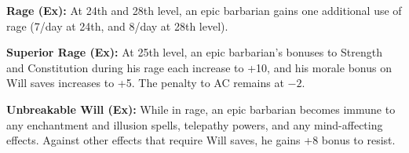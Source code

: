 \textbf{Rage (Ex):} At 24th and 28th level, an epic barbarian gains one additional use of rage (7/day at 24th, and 8/day at 28th level).

\textbf{Superior Rage (Ex):} At 25th level, an epic barbarian's bonuses to Strength and Constitution during his rage each increase to +10, and his morale bonus on Will saves increases to +5. The penalty to AC remains at $-2$.

\textbf{Unbreakable Will (Ex):} While in rage, an epic barbarian becomes immune to any enchantment and illusion spells, telepathy powers, and any mind-affecting effects. Against other effects that require Will saves, he gains +8 bonus to resist.